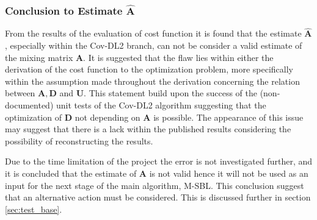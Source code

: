 \subsubsection{Conclusion to Estimate $\hat{\mathbf{A}}$}
From the results of the evaluation of cost function it is found that the estimate $\hat{\mathbf{A}}$, especially within the Cov-DL2 branch, can not be consider a valid estimate of the mixing matrix $\mathbf{A}$. 
It is suggested that the flaw lies within either the  derivation of the cost function to the optimization problem, more specifically within the assumption made throughout the derivation concerning the relation between $\mathbf{A}, \mathbf{D}$ and $\mathbf{U}$. 
This statement build upon the success of the (non-documented) unit tests of the Cov-DL2 algorithm suggesting that the optimization of $\mathbf{D}$ not depending on $\mathbf{A}$ is possible.
The appearance of this issue may suggest that there is a lack within the published results \cite{Balkan2015} considering the possibility of reconstructing the results.  

Due to the time limitation of the project the error is not investigated further, and it is concluded that the estimate of $\mathbf{A}$ is not valid hence it will not be used as an input for the next stage of the main algorithm, M-SBL. This conclusion suggest that an alternative action must be considered. This is discussed further in section \ref{sec:test_base}.

